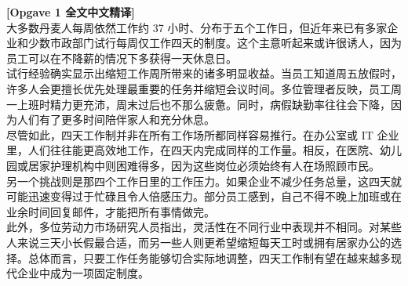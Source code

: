 \begin{transbox}
\small
\textbf{\color{NCDTeal}[Opgave 1 全文中文精译]}\\
大多数丹麦人每周依然工作约 37 小时、分布于五个工作日，但近年来已有多家企业和少数市政部门试行每周仅工作四天的制度。这个主意听起来或许很诱人，因为员工可以在不降薪的情况下多获得一天休息日。\\[3pt]
试行经验确实显示出缩短工作周所带来的诸多明显收益。当员工知道周五放假时，许多人会更擅长优先处理最重要的任务并缩短会议时间。多位管理者反映，员工周一上班时精力更充沛，周末过后也不那么疲惫。同时，病假缺勤率往往会下降，因为人们有了更多时间陪伴家人和充分休息。\\[3pt]
尽管如此，四天工作制并非在所有工作场所都同样容易推行。在办公室或 IT 企业里，人们往往能更高效地工作，在四天内完成同样的工作量。相反，在医院、幼儿园或居家护理机构中则困难得多，因为这些岗位必须始终有人在场照顾市民。\\[3pt]
另一个挑战则是那四个工作日里的工作压力。如果企业不减少任务总量，这四天就可能迅速变得过于忙碌且令人倍感压力。部分员工感到，自己不得不晚上加班或在业余时间回复邮件，才能把所有事情做完。\\[3pt]
此外，多位劳动力市场研究人员指出，灵活性在不同行业中表现并不相同。对某些人来说三天小长假最合适，而另一些人则更希望缩短每天工时或拥有居家办公的选择。总体而言，只要工作任务能够切合实际地调整，四天工作制有望在越来越多现代企业中成为一项固定制度。
\end{transbox}

